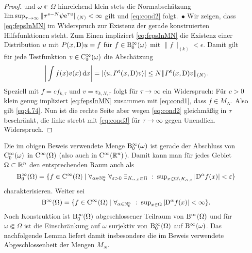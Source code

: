 \begin{proof}
und $\omega\Subset\Omega$ hinreichend klein stets die Normabschätzung $\limsup_{\tau\to\infty} \|\tau^{s-N}\psi \mathrm e^{\tau u}\|_{(N)}<\infty$ gilt und \eqref{eq:cond2} folgt.~$\bullet$  Wir zeigen, dass \eqref{eq:fepsInMN} im Widerspruch zur Existenz der gerade konstruierten Hilfsfunktionen steht. 
Zum Einen impliziert \eqref{eq:fepsInMN} die Existenz einer Distribution $u$ mit $P(x,\mathrm D)u=f$ für $f\in \mathrm B^\infty_0(\omega)$ mit $\|f\|_{(k)}<\epsilon$. Damit gilt für jede Testfunktion $v\in\mathrm C_0^\infty(\omega)$ die Abschätzung
\begin{equation}\label{eq:4.74}
   \bigg| \int f(x) v(x) \,\mathrm d x\bigg| = |\langle u, P^{\mathrm t}(x,\mathrm D) v \rangle| \le N \| P^{\mathrm t}(x,\mathrm D) v\|_{(N)}.
\end{equation}
Speziell mit $f=c f_{k,\tau}$ und $v=v_{k,N,\tau}$ folgt für $\tau\to\infty$ ein Widerspruch: Für $c>0$ klein genug impliziert \eqref{eq:fepsInMN} zusammen mit \eqref{eq:cond1}, dass $f\in M_N$. Also gilt \eqref{eq:4.74}. Nun ist die rechte Seite aber wegen \eqref{eq:cond2} gleichmäßig in $\tau$ beschränkt, die linke strebt mit \eqref{eq:cond3} für $\tau\to\infty$  gegen Unendlich. Widerspruch.
\end{proof}


\begin{rem}
Die im obigen Beweis verwendete Menge $\mathrm B^\infty_0(\omega)$ ist gerade der Abschluss von $\mathrm C_0^\infty(\omega)$ in $\mathrm C^\infty(\Omega)$
(also auch in $\mathrm C^\infty(\mathbb R^n)$). Damit kann man für jedes Gebiet $\Omega\subset\mathbb R^n$ den entsprechenden Raum auch als
\begin{equation}
\mathrm B_0^\infty(\Omega) =\{f\in \mathrm C^\infty(\Omega) \mid \forall_{\alpha\in\mathbb N_0^n}\;\forall_{\varepsilon >0} \;\exists_{K_{\alpha,\varepsilon}\Subset\Omega} \;:\; \sup\nolimits_{x\in \Omega\setminus K_{\alpha,\varepsilon}}|\mathrm D^\alpha f(x)|<\varepsilon \}
\end{equation}
charakterisieren. Weiter sei 
\begin{equation}
\mathrm B^\infty(\Omega) = \{ f\in\mathrm C^\infty(\Omega) \mid  \forall_{\alpha\in\mathbb N_0^n} \;:\; \sup\nolimits_{x\in\Omega} |\mathrm D^\alpha f(x)|<\infty \}.
\end{equation}
Nach Konstruktion ist $\mathrm B^\infty_0(\Omega)$ abgeschlossener Teilraum von $\mathrm B^\infty(\Omega)$ und für $\omega\Subset\Omega$ ist die Einschränkung auf $\omega$ surjektiv von $\mathrm B^\infty_0(\Omega)$ auf $\mathrm B^\infty(\omega)$. Das nachfolgende Lemma liefert damit insbesondere die im Beweis verwendete Abgeschlossenheit der Mengen $M_N$.
\end{rem}


